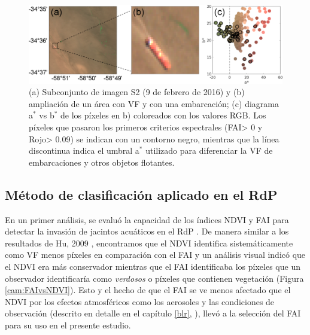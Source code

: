         \begin{figure}
        \centering
        \includegraphics[width=\textwidth]{cam/figures/embarcacion.png}
        \caption[Imagen S2 mostrando un área con vegetación flotante y con una embarcación y diagrama a$^{*}$ vs b$^{*}$ de los píxeles de la imagen]{(a) Subconjunto de imagen S2 (9 de febrero de 2016) y (b) ampliación de un área con VF y con una embarcación; (c) diagrama a$^{*}$ vs b$^{*}$ de los píxeles en b) coloreados con los valores RGB. Los píxeles que pasaron los primeros criterios espectrales (FAI> 0 y Rojo> 0.09) se indican con un contorno negro, mientras que la línea discontinua indica el umbral a$^{*}$ utilizado para diferenciar la VF de embarcaciones y otros objetos flotantes.}
        \label{cam:embarcacion}
        \end{figure}
        
    \subsection{Método de clasificación aplicado en el RdP}
    \label{cam:s:clasificacion}
    
        En un primer análisis, se evaluó la capacidad de los índices NDVI \cite{shi2009} y FAI para detectar la invasión de jacintos acuáticos en el RdP \cite{dogliotti2016b}. De manera similar a los resultados de Hu, 2009 \cite{hu2009}, encontramos que el NDVI identifica sistemáticamente como VF menos píxeles en comparación con el FAI y un análisis visual indicó que el NDVI era más conservador mientras que el FAI identificaba los píxeles que un observador identificaría como \textit{verdosos} o píxeles que contienen vegetación (Figura \ref{cam:FAIvsNDVI}). Esto y el hecho de que el FAI se ve menos afectado que el NDVI por los efectos atmosféricos como los aerosoles y las condiciones de observación (descrito en detalle en el capítulo \ref{blr}, \cite{hu2009}), llevó a la selección del FAI para su uso en el presente estudio.


